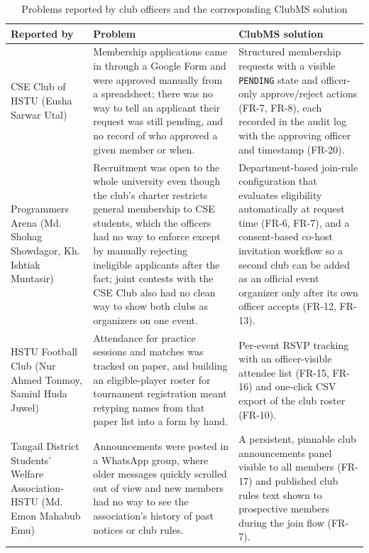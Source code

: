\documentclass[12pt,oneside]{book}
\begin{document}
\begin{table}[H]
\caption{Problems reported by club officers and the corresponding ClubMS solution}
\label{tab:3.1b}
\centering
\small
\begin{tabularx}{\textwidth}{@{}L{3.4cm}X L{4.7cm}@{}}
\toprule
Reported by & Problem & ClubMS solution \\
\midrule
CSE Club of HSTU (Eusha Sarwar Utal) & Membership applications came in through a Google Form and were approved manually from a spreadsheet; there was no way to tell an applicant their request was still pending, and no record of who approved a given member or when. & Structured membership requests with a visible \texttt{PENDING} state and officer-only approve/reject actions (FR-7, FR-8), each recorded in the audit log with the approving officer and timestamp (FR-20). \\
Programmers Arena (Md. Shohag Showdagor, Kh. Ishtiak Muntasir) & Recruitment was open to the whole university even though the club's charter restricts general membership to CSE students, which the officers had no way to enforce except by manually rejecting ineligible applicants after the fact; joint contests with the CSE Club also had no clean way to show both clubs as organizers on one event. & Department-based join-rule configuration that evaluates eligibility automatically at request time (FR-6, FR-7), and a consent-based co-host invitation workflow so a second club can be added as an official event organizer only after its own officer accepts (FR-12, FR-13). \\
HSTU Football Club (Nur Ahmed Tonmoy, Samiul Huda Juwel) & Attendance for practice sessions and matches was tracked on paper, and building an eligible-player roster for tournament registration meant retyping names from that paper list into a form by hand. & Per-event RSVP tracking with an officer-visible attendee list (FR-15, FR-16) and one-click CSV export of the club roster (FR-10). \\
Tangail District Students' Welfare Association-HSTU (Md. Emon Mahabub Emu) & Announcements were posted in a WhatsApp group, where older messages quickly scrolled out of view and new members had no way to see the association's history of past notices or club rules. & A persistent, pinnable club announcements panel visible to all members (FR-17) and published club rules text shown to prospective members during the join flow (FR-7). \\
\bottomrule
\end{tabularx}
\end{table}
\end{document}
